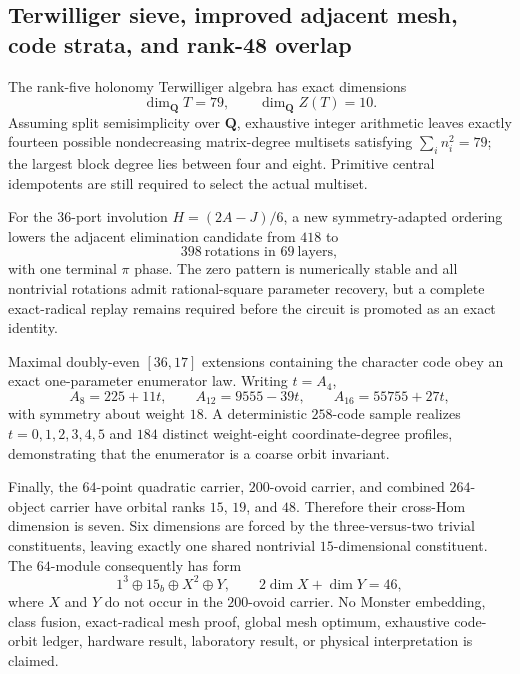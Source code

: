 \subsection{Terwilliger sieve, improved adjacent mesh, code strata, and rank-48 overlap}
\label{sec:bt3905-3912}

The rank-five holonomy Terwilliger algebra has exact dimensions
\[
\dim_{\mathbf Q}T=79,
\qquad
\dim_{\mathbf Q}Z(T)=10.
\]
Assuming split semisimplicity over $\mathbf Q$, exhaustive integer arithmetic leaves exactly fourteen possible nondecreasing matrix-degree multisets satisfying $\sum_i n_i^2=79$; the largest block degree lies between four and eight. Primitive central idempotents are still required to select the actual multiset.

For the $36$-port involution $H=(2A-J)/6$, a new symmetry-adapted ordering lowers the adjacent elimination candidate from $418$ to
\[
398\ \text{rotations in }69\ \text{layers},
\]
with one terminal $\pi$ phase. The zero pattern is numerically stable and all nontrivial rotations admit rational-square parameter recovery, but a complete exact-radical replay remains required before the circuit is promoted as an exact identity.

Maximal doubly-even $[36,17]$ extensions containing the character code obey an exact one-parameter enumerator law. Writing $t=A_4$,
\[
A_8=225+11t,
\qquad
A_{12}=9555-39t,
\qquad
A_{16}=55755+27t,
\]
with symmetry about weight $18$. A deterministic $258$-code sample realizes $t=0,1,2,3,4,5$ and $184$ distinct weight-eight coordinate-degree profiles, demonstrating that the enumerator is a coarse orbit invariant.

Finally, the $64$-point quadratic carrier, $200$-ovoid carrier, and combined $264$-object carrier have orbital ranks $15$, $19$, and $48$. Therefore their cross-Hom dimension is seven. Six dimensions are forced by the three-versus-two trivial constituents, leaving exactly one shared nontrivial $15$-dimensional constituent. The $64$-module consequently has form
\[
1^3\oplus15_b\oplus X^2\oplus Y,
\qquad
2\dim X+\dim Y=46,
\]
where $X$ and $Y$ do not occur in the $200$-ovoid carrier. No Monster embedding, class fusion, exact-radical mesh proof, global mesh optimum, exhaustive code-orbit ledger, hardware result, laboratory result, or physical interpretation is claimed.
